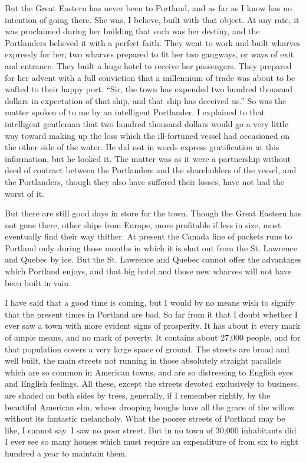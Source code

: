 But the Great Eastern has never been to Portland, and as far as I
know has no intention of going there.  She was, I believe, built
with that object.  At any rate, it was proclaimed during her
building that such was her destiny, and the Portlanders believed it
with a perfect faith.  They went to work and built wharves
expressly for her; two wharves prepared to fit her two gangways, or
ways of exit and entrance.  They built a huge hotel to receive her
passengers.  They prepared for her advent with a full conviction
that a millennium of trade was about to be wafted to their happy
port.  ``Sir, the town has expended two hundred thousand dollars in
expectation of that ship, and that ship has deceived us.''  So was
the matter spoken of to me by an intelligent Portlander.  I
explained to that intelligent gentleman that two hundred thousand
dollars would go a very little way toward making up the loss which
the ill-fortuned vessel had occasioned on the other side of the
water.  He did not in words express gratification at this
information, but he looked it.  The matter was as it were a
partnership without deed of contract between the Portlanders and
the shareholders of the vessel, and the Portlanders, though they
also have suffered their losses, have not had the worst of it.

But there are still good days in store for the town.  Though the
Great Eastern has not gone there, other ships from Europe, more
profitable if less in size, must eventually find their way thither.
At present the Canada line of packets runs to Portland only during
those months in which it is shut out from the St. Lawrence and
Quebec by ice.  But the St. Lawrence and Quebec cannot offer the
advantages which Portland enjoys, and that big hotel and those new
wharves will not have been built in vain.

I have said that a good time is coming, but I would by no means
wish to signify that the present times in Portland are bad.  So far
from it that I doubt whether I ever saw a town with more evident
signs of prosperity.  It has about it every mark of ample means,
and no mark of poverty.  It contains about 27,000 people, and for
that population covers a very large space of ground.  The streets
are broad and well built, the main streets not running in those
absolutely straight parallels which are so common in American
towns, and are so distressing to English eyes and English feelings.
All these, except the streets devoted exclusively to business, are
shaded on both sides by trees, generally, if I remember rightly, by
the beautiful American elm, whose drooping boughs have all the
grace of the willow without its fantastic melancholy.  What the
poorer streets of Portland may be like, I cannot say.  I saw no
poor street.  But in no town of 30,000 inhabitants did I ever see
so many houses which must require an expenditure of from six to
eight hundred a year to maintain them.

